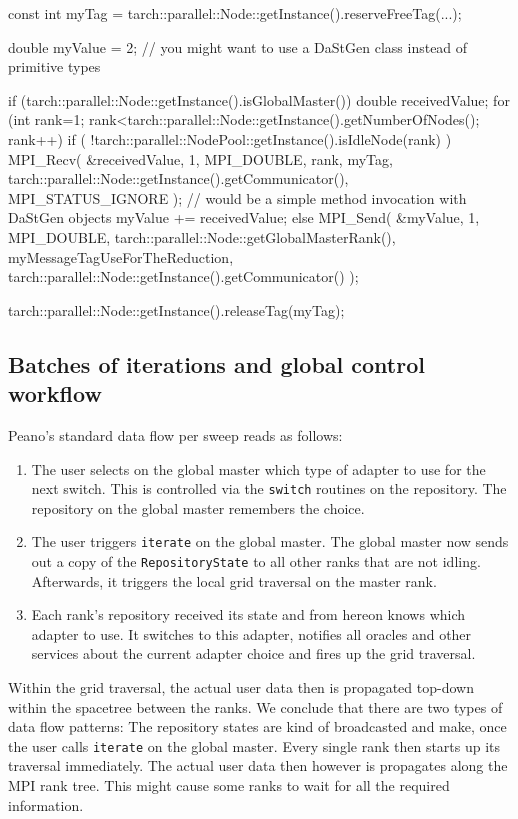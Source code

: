 \begin{code}
  const int myTag = tarch::parallel::Node::getInstance().reserveFreeTag(...);

  double myValue = 2; // you might want to use a DaStGen class instead of primitive types

  if (tarch::parallel::Node::getInstance().isGlobalMaster()) {
     double receivedValue;
     for (int rank=1; rank<tarch::parallel::Node::getInstance().getNumberOfNodes(); rank++) {
       if ( !tarch::parallel::NodePool::getInstance().isIdleNode(rank) ) {
         MPI_Recv( &receivedValue, 1, MPI_DOUBLE, rank, myTag,
           tarch::parallel::Node::getInstance().getCommunicator(),
           MPI_STATUS_IGNORE ); // would be a simple method invocation with DaStGen objects 
         myValue += receivedValue;
       }
     }
  }
  else {
    MPI_Send( &myValue, 1, MPI_DOUBLE, tarch::parallel::Node::getGlobalMasterRank(),
      myMessageTagUseForTheReduction, tarch::parallel::Node::getInstance().getCommunicator() );
  }

  tarch::parallel::Node::getInstance().releaseTag(myTag);
\end{code}


\subsection{Batches of iterations and global control workflow}

Peano's standard data flow per sweep reads as follows:

\begin{enumerate}
  \item The user selects on the global master which type of adapter to use for
  the next switch. This is controlled via the \texttt{switch} routines on the
  repository. The repository on the global master remembers the choice.
  \item The user triggers \texttt{iterate} on the global master. The global
  master now sends out a copy of the \texttt{RepositoryState} to all other ranks
  that are not idling. Afterwards, it triggers the local grid traversal on
  the master rank.
  \item Each rank's repository received its state and from hereon knows which
  adapter to use. It switches to this adapter, notifies all oracles and other
  services about the current adapter choice and fires up the grid traversal.
\end{enumerate}

\noindent
Within the grid traversal, the actual user data then is propagated top-down
within the spacetree between the ranks. 
We conclude that there are two types of data flow patterns: 
The repository states are kind of broadcasted and make, once the user calls
\texttt{iterate} on the global master. 
Every single rank then starts up its traversal immediately.
The actual user data then however is propagates along the MPI rank tree.
This might cause some ranks to wait for all the required information.


